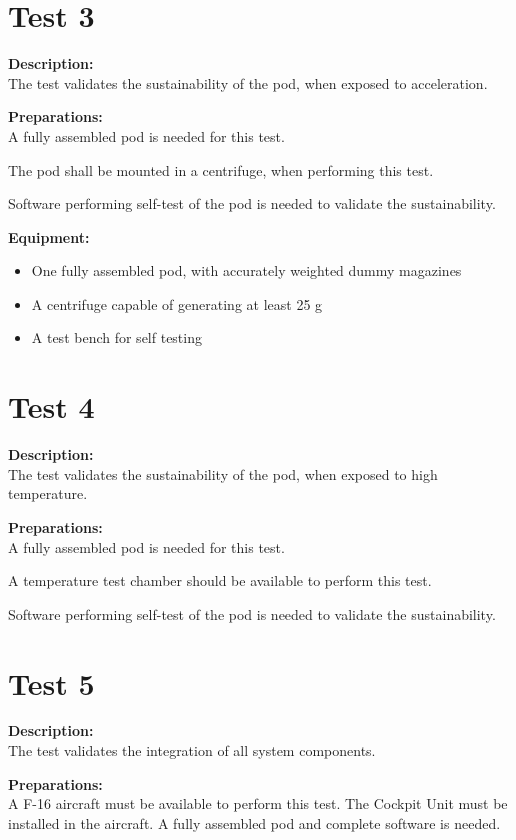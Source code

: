 \documentclass[Main]{subfiles}
\begin{document}
\section{Test 3}
\textbf{Description: }\\
The test validates the sustainability of the pod, when exposed to acceleration.

\textbf{Preparations: }\\
A fully assembled pod is needed for this test. 

The pod shall be mounted in a centrifuge, when performing this test.

Software performing self-test of the pod is needed to validate the sustainability.

\textbf{Equipment:}
\begin{itemize}
\item One fully assembled pod, with accurately weighted dummy magazines
\item A centrifuge capable of generating at least 25 g
\item A test bench for self testing
\end{itemize}

\section{Test 4}
\textbf{Description: }\\
The test validates the sustainability of the pod, when exposed to high temperature.

\textbf{Preparations: }\\
A fully assembled pod is needed for this test. 

A temperature test chamber should be available to perform this test.

Software performing self-test of the pod is needed to validate the sustainability.

\section{Test 5}
\textbf{Description: }\\
The test validates the integration of all system components.

\textbf{Preparations: }\\
A F-16 aircraft must be available to perform this test. The Cockpit Unit must be installed in the aircraft.
A fully assembled pod and complete software is needed.
\end{document}
